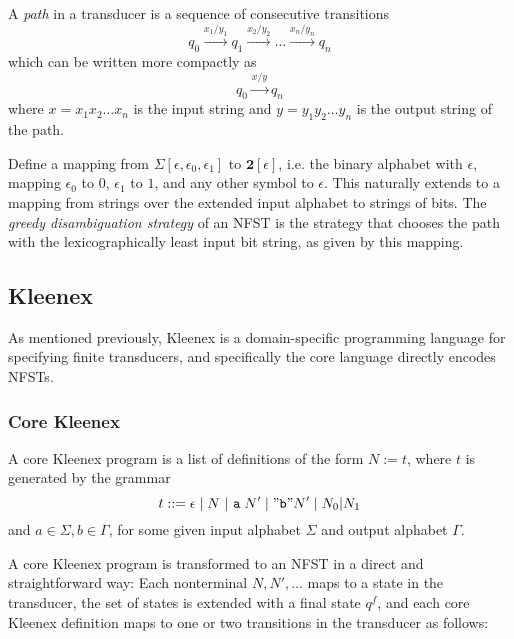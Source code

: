 A \emph{path} in a transducer is a sequence of consecutive
transitions
\[
  q_0 \xrightarrow{x_1/y_1} q_1 \xrightarrow{x_2/y_2} \dots
  \xrightarrow{x_n/y_n} q_n
\]
which can be written more compactly as
\[
  q_0 \xrightarrow{x/y} q_n
\]
where $x = x_1x_2 \dots x_n$ is the input string and $y = y_1y_2 \dots y_n$ is
the output string of the path.

Define a mapping from $\Sigma[\epsilon, \epsilon_0, \epsilon_1]$ to
$\mathbf{2}[\epsilon]$, i.e. the binary alphabet with $\epsilon$, mapping
$\epsilon_0$ to $0$, $\epsilon_1$ to $1$, and any other symbol to
$\epsilon$. This naturally extends to a mapping from strings over the extended
input alphabet to strings of bits. The \emph{greedy disambiguation strategy} of
an NFST is the strategy that chooses the path with the lexicographically least
input bit string, as given by this mapping.



\subsection{Kleenex}

As mentioned previously, Kleenex is a domain-specific programming language for
specifying finite transducers, and specifically the core language directly
encodes NFSTs.

\subsubsection{Core Kleenex}

\begin{definition}
  A core Kleenex program is a list of definitions of the form $N := t$, where
  $t$ is generated by the grammar
  \[
    t ::= \epsilon \;|\; N \ |\ \mathtt{a}\; N' \;|\; \mathtt{"b"} N' \;|\;
    N_0|N_1
  \]
  and $a \in \Sigma, b \in \Gamma$, for some given input alphabet $\Sigma$ and
  output alphabet $\Gamma$.
\end{definition}

A core Kleenex program is transformed to an NFST in a direct and
straightforward way: Each nonterminal $N, N', \dots$ maps to a state in the
transducer, the set of states is extended with a final state $q^f$, and each
core Kleenex definition maps to one or two transitions in the transducer as
follows:

